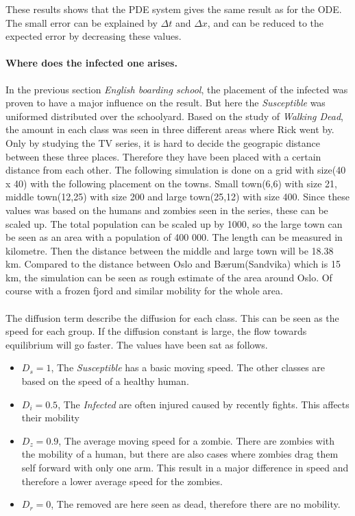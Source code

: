 \documentclass[%
twoside,                 %
final,                   %
10pt]{article}
\begin{document}
\noindent
These results shows that the PDE system gives the same result as for the ODE. The small error can be explained by $\Delta t$ and $\Delta x$, and can be reduced to the expected error by decreasing these values.



\paragraph{Where does the infected one arises.}
In the previous section \emph{English boarding school}, the placement of the infected was proven to have a major influence on the result. But here the \emph{Susceptible} was uniformed distributed over the schoolyard. Based on the study of \emph{Walking Dead}, the amount in each class was seen in three different areas where Rick went by. Only by studying the TV series, it is hard to decide the geograpic distance between these three places. Therefore they have been placed with a certain distance from each other. The following simulation is done on a grid with size(40 x 40) with the following placement on the towns. Small town(6,6) with size 21, middle town(12,25) with size 200 and large town(25,12) with size 400. Since these values was based on the humans and zombies seen in the series, these can be scaled up. The total population can be scaled up by 1000, so the large town can be seen as an area with a population of 400 000. The length can be measured in kilometre. Then the distance between the middle and large town will be 18.38 km. Compared to the distance between Oslo and Bærum(Sandvika) which is 15 km, the simulation can be seen as rough estimate of the area around Oslo. Of course with a frozen fjord and similar mobility for the whole area.  
\\
\\
The diffusion term describe the diffusion for each class. This can be seen as the speed for each group. If the diffusion constant is large, the flow towards equilibrium will go faster. The values have been sat as follows. 
\begin{itemize}
\item $D_s=1$, The \emph{Susceptible} has a basic moving speed. The other classes are based on the speed of a healthy human.

\item $D_i=0.5$, The \emph{Infected} are often injured caused by recently fights. This affects their mobility

\item $D_z=0.9$, The average moving speed for a zombie. There are zombies with the mobility of a human, but there are also cases where zombies drag them self forward with only one arm. This result in a major difference in speed and therefore a lower average speed for the zombies.

\item $D_r=0$, The removed are here seen as dead, therefore there are no mobility.
\end{itemize}
\end{document}
